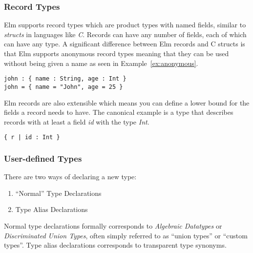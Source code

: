 \documentclass[../thesis.tex]{subfiles}
\begin{document}
\subsubsection{Record Types}
Elm supports record types which are product types with named fields, similar to \textit{structs} in languages like \textit{C}.
Records can have any number of fields, each of which can have any type.
A significant difference between Elm records and C structs is that Elm supports anonymous record types
meaning that they can be used without being given a name as seen in Example~\ref{ex:anonymous}.
\begin{example}\label{ex:anonymous}
\begin{verbatim}
john : { name : String, age : Int }
john = { name = "John", age = 25 }
\end{verbatim}
\end{example}
Elm records are also extensible which means you can define a lower bound
for the fields a record needs to have.
The canonical example is a type that describes records with at least a field \textit{id} with the type \textit{Int}.
\begin{example}
\begin{verbatim}
{ r | id : Int }
\end{verbatim}
\end{example}




\subsubsection{User-defined Types}
There are two ways of declaring a new type:
\begin{enumerate}
    \item{``Normal'' Type Declarations} 
    \item{Type Alias Declarations} 
\end{enumerate}
Normal type declarations formally corresponds to \textit{Algebraic Datatypes} or \textit{Discriminated Union Types},
often simply referred to as ``union types'' or ``custom types''.
Type alias declarations corresponds to transparent type synonyms.
\end{document}
